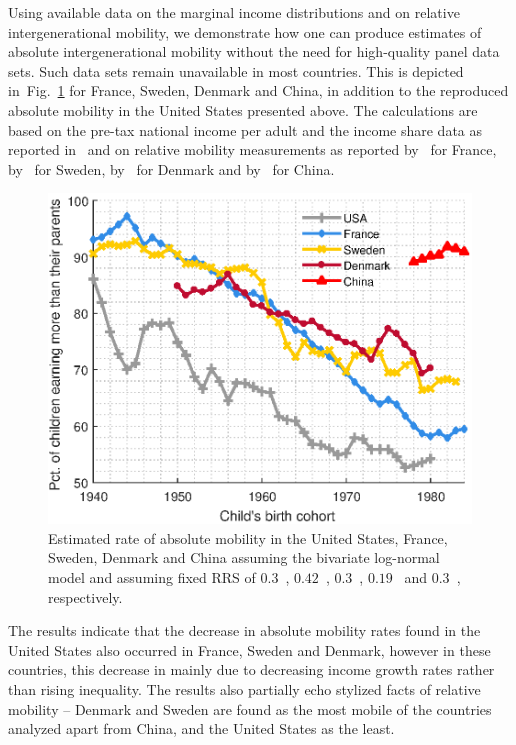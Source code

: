 \documentclass[12pt,a4paper]{article}
\newcommand{\flabel}[1]{\label{fig:#1}}
\newcommand{\fref}[1]{Fig.~\ref{fig:#1}}
\numberwithin{equation}{section}
\begin{document}
Using available data on the marginal income distributions and on relative intergenerational mobility, we demonstrate how one can produce estimates of absolute intergenerational mobility without the need for high-quality panel data sets. Such data sets remain unavailable in most countries. This is depicted in~\fref{countries} for France, Sweden, Denmark and China, in addition to the reproduced absolute mobility in the United States presented above. The calculations are based on the pre-tax national income per adult and the income share data as reported in~\citet{WID2017} and on relative mobility measurements as reported by~\citet{lefranc2005intergenerational} for France, by~\citet{bjorklund1997intergenerational} for Sweden, by~\citet{landerso2016scandinavian} for Denmark and by~\citet{fan2015great} for China.

\begin{figure}[!htb]
\centering
\includegraphics[width=1.0\textwidth] {./figs/countries2.eps}
\caption{Estimated rate of absolute mobility in the United States, France, Sweden, Denmark and China assuming the bivariate log-normal model and assuming fixed RRS of $0.3$~\citep{chetty2014land}, $0.42$~\citep{lefranc2005intergenerational}, $0.3$~\citep{bjorklund1997intergenerational}, $0.19$~\citep{landerso2016scandinavian} and $0.3$~\citep{fan2015great}, respectively.}
\flabel{countries}
\end{figure}

The results indicate that the decrease in absolute mobility rates found in the United States also occurred in France, Sweden and Denmark, however in these countries, this decrease in mainly due to decreasing income growth rates rather than rising inequality. The results also partially echo stylized facts of relative mobility -- Denmark and Sweden are found as the most mobile of the countries analyzed apart from China, and the United States as the least.
\end{document}
